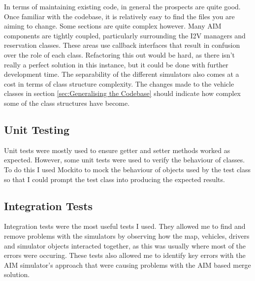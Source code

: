 In terms of maintaining existing code, in general the prospects are quite good. Once familiar with the codebase, it is relatively easy to find the files you are aiming to change. Some sections are quite complex however. Many AIM components are tightly coupled, particularly surrounding the I2V managers and reservation classes. These areas use callback interfaces that result in confusion over the role of each class. Refactoring this out would be hard, as there isn't really a perfect solution in this instance, but it could be done with further development time. The separability of the different simulators also comes at a cost in terms of class structure complexity. The changes made to the vehicle classes in section \ref{sec:Generalising the Codebase} should indicate how complex some of the class structures have become.

\subsection{Unit Testing}
\label{subsec:Unit Testing}
Unit tests were mostly used to ensure getter and setter methods worked as expected. However, some unit tests were used to verify the behaviour of classes. To do this I used Mockito \citep{MockitoWebsite} to mock the behaviour of objects used by the test class so that I could prompt the test class into producing the expected results.

\subsection{Integration Tests}
\label{subsec:Integration Tests}
Integration tests were the most useful tests I used. They allowed me to find and remove problems with the simulators by observing how the map, vehicles, drivers and simulator objects interacted together, as this was usually where most of the errors were occuring. These tests also allowed me to identify key errors with the AIM simulator's approach that were causing problems with the AIM based merge solution.



